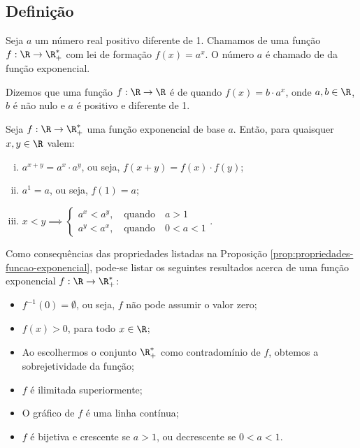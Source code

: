 \subsection{Definição}

\begin{definition}
    Seja $a$ um número real positivo diferente de 1. Chamamos de
 uma função $f: \R \to \R_+^*$ com lei de
formação $f(x) = a^x$. O número $a$ é chamado de  da função exponencial.
\end{definition}

\begin{definition}
Dizemos que uma função $f: \R \to \R$ é de 
quando $f(x) =b\cdot a^x$, onde $a,b \in\R$, $b$ é não nulo e $a$ é
positivo e diferente de 1.
\end{definition}

\begin{proposition}
\label{prop:propriedades-funcao-exponencial}
Seja $f: \R \to \R_+^*$ uma função exponencial de base $a$.
Então, para quaisquer $x, y \in \R$ valem:
%
\begin{enumerate}[(i)]
  \item  $a^{x+y} = a^x\cdot a^y$, ou seja, $f(x+y) = f(x)\cdot f(y)$;
  \item $a^1 = a$, ou seja, $f(1) = a$;
  \item $x<y \implies \begin{cases} a^x < a^y, \ \ \ \text{ quando } \ \ \ a>1 \\
                                    a^y < a^x, \ \ \ \text{ quando } \ \ \ 0<a<1
                       \end{cases}.$
\end{enumerate}
\end{proposition}

Como consequências das propriedades listadas na Proposição \ref{prop:propriedades-funcao-exponencial},
pode-se listar os seguintes resultados acerca de uma função exponencial $f: \R \to \R_+^*$:
%
\begin{itemize}
    \item $f^{-1}(0) = \emptyset$, ou seja, $f$ não pode assumir o valor
    zero;
    \item $f(x)>0$, para todo $x \in \R$;
    \item Ao escolhermos o conjunto $\R_+^*$ como contradomínio de $f$, obtemos
    a sobrejetividade da função;
    \item $f$ é ilimitada superiormente;
    \item O gráfico de $f$ é uma linha contínua;
    \item $f$ é bijetiva e crescente se $a>1$, ou decrescente se
    $0<a<1$.
\end{itemize}
